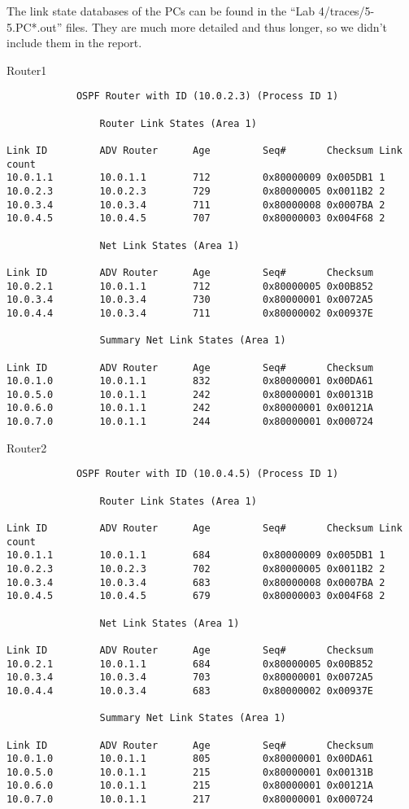 The link state databases of the PCs can be found in the ``Lab 4/traces/5-5.PC*.out'' files. They are much more detailed and thus longer, so we didn't include them in the report.

Router1
\begin{lstlisting}
            OSPF Router with ID (10.0.2.3) (Process ID 1)

                Router Link States (Area 1)

Link ID         ADV Router      Age         Seq#       Checksum Link count
10.0.1.1        10.0.1.1        712         0x80000009 0x005DB1 1
10.0.2.3        10.0.2.3        729         0x80000005 0x0011B2 2
10.0.3.4        10.0.3.4        711         0x80000008 0x0007BA 2
10.0.4.5        10.0.4.5        707         0x80000003 0x004F68 2

                Net Link States (Area 1)

Link ID         ADV Router      Age         Seq#       Checksum
10.0.2.1        10.0.1.1        712         0x80000005 0x00B852
10.0.3.4        10.0.3.4        730         0x80000001 0x0072A5
10.0.4.4        10.0.3.4        711         0x80000002 0x00937E

                Summary Net Link States (Area 1)

Link ID         ADV Router      Age         Seq#       Checksum
10.0.1.0        10.0.1.1        832         0x80000001 0x00DA61
10.0.5.0        10.0.1.1        242         0x80000001 0x00131B
10.0.6.0        10.0.1.1        242         0x80000001 0x00121A
10.0.7.0        10.0.1.1        244         0x80000001 0x000724
\end{lstlisting}

Router2
\begin{lstlisting}
            OSPF Router with ID (10.0.4.5) (Process ID 1)

                Router Link States (Area 1)

Link ID         ADV Router      Age         Seq#       Checksum Link count
10.0.1.1        10.0.1.1        684         0x80000009 0x005DB1 1
10.0.2.3        10.0.2.3        702         0x80000005 0x0011B2 2
10.0.3.4        10.0.3.4        683         0x80000008 0x0007BA 2
10.0.4.5        10.0.4.5        679         0x80000003 0x004F68 2

                Net Link States (Area 1)

Link ID         ADV Router      Age         Seq#       Checksum
10.0.2.1        10.0.1.1        684         0x80000005 0x00B852
10.0.3.4        10.0.3.4        703         0x80000001 0x0072A5
10.0.4.4        10.0.3.4        683         0x80000002 0x00937E

                Summary Net Link States (Area 1)

Link ID         ADV Router      Age         Seq#       Checksum
10.0.1.0        10.0.1.1        805         0x80000001 0x00DA61
10.0.5.0        10.0.1.1        215         0x80000001 0x00131B
10.0.6.0        10.0.1.1        215         0x80000001 0x00121A
10.0.7.0        10.0.1.1        217         0x80000001 0x000724
\end{lstlisting}

